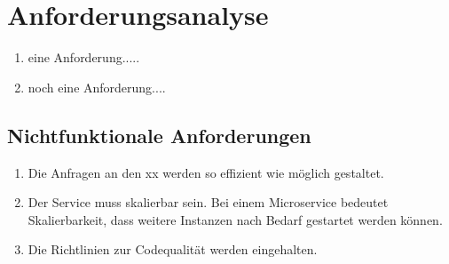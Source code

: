 \section{Anforderungsanalyse}

\begin{enumerate}
    \item eine Anforderung.....
    \item noch eine Anforderung....
\end{enumerate}

\subsection{Nichtfunktionale Anforderungen}
\begin{enumerate}
    \item Die Anfragen an den xx werden so effizient wie möglich gestaltet. 
    \item Der Service muss skalierbar sein. Bei einem Microservice bedeutet Skalierbarkeit, dass weitere Instanzen nach Bedarf gestartet werden können.
    \item Die Richtlinien zur Codequalität werden eingehalten. 
\end{enumerate}
